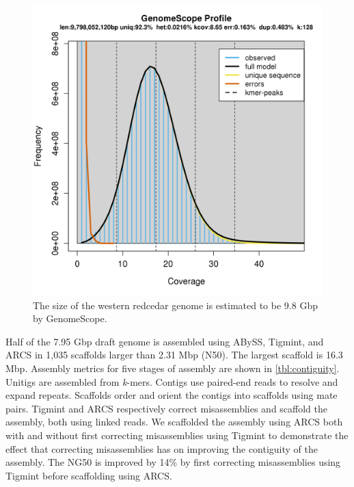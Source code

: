 \documentclass[
  12pt,
  oneside,
  openany]{book}
\begin{document}
\begin{figure}
\hypertarget{fig:genomescope}{%
\centering
\includegraphics{redcedar/genomescope.png}
\caption[The size of the western redcedar genome is estimated to be 9.8 Gbp by GenomeScope.]{The size of the western redcedar genome is estimated to be 9.8 Gbp by GenomeScope.}\label{fig:genomescope}
}
\end{figure}

Half of the 7.95 Gbp draft genome is assembled using ABySS, Tigmint, and ARCS in 1,035 scaffolds larger than 2.31 Mbp (N50). The largest scaffold is 16.3 Mbp. Assembly metrics for five stages of assembly are shown in \cref{tbl:contiguity}. Unitigs are assembled from \emph{k}-mers. Contigs use paired-end reads to resolve and expand repeats. Scaffolds order and orient the contigs into scaffolds using mate pairs. Tigmint and ARCS respectively correct misassemblies and scaffold the assembly, both using linked reads. We scaffolded the assembly using ARCS both with and without first correcting misassemblies using Tigmint to demonstrate the effect that correcting misassemblies has on improving the contiguity of the assembly. The NG50 is improved by 14\% by first correcting misassemblies using Tigmint before scaffolding using ARCS.
\end{document}
